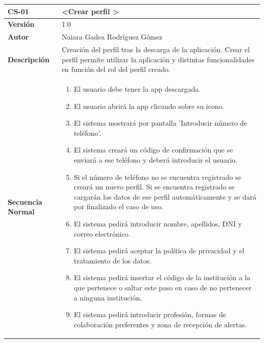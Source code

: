 
\begin{table}[htbp]
\centering
\begin{tabular}{ |m{3cm}|m{11cm}|  } 
\hline
\cellcolor[HTML]{B9E3F0}\centering\textbf{CS-01} & \cellcolor[HTML]{B9E3F0}\textbf{\textless Crear perfil \textgreater}\\

\hline
\cellcolor[HTML]{EFEFEF}\textbf{Versión}             & 1.0  \\
\hline
\cellcolor[HTML]{EFEFEF}\textbf{Autor}                & Naiara Gadea Rodríguez Gómez\\
\hline
\cellcolor[HTML]{EFEFEF}\textbf{Descripción}                & { Creación del perfil tras la descarga de la aplicación. Crear el perfil permite utilizar la aplicación y distintas funcionalidades en función del rol del perfil creado. }\\
\hline
\cellcolor[HTML]{EFEFEF}\textbf{Secuencia \newline Normal}                &                 
        \begin{enumerate}
            \item El usuario debe tener la app descargada.
            \item El usuario abrirá la app clicando sobre su icono.
            \item El sistema mostrará por pantalla 'Introducir número de teléfono'.
            \item El sistema creará un código de confirmación que se enviará a ese teléfono y deberá introducir el usuario.
            \item Si el número de teléfono no se encuentra registrado se creará un nuevo perfil. Si se encuentra registrado se cargarán los datos de ese perfil automáticamente y se dará por finalizado el caso de uso.
            \item El sistema pedirá introducir nombre, apellidos, DNI y correo electrónico.
            \item El sistema pedirá aceptar la política de privacidad y el tratamiento de los datos.
            \item El sistema pedirá insertar el código de la institución a la que pertenece o saltar este paso en caso de no pertenecer a ninguna institución.
            \item El sistema pedirá introducir profesión, formas de colaboración preferentes y zona de recepción de alertas.

\end{enumerate}
\end{tabular}
\end{table}

